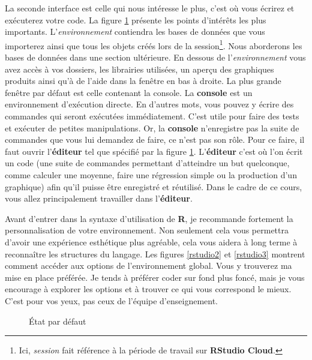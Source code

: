 \documentclass[10.5pt,a4paper]{article}
\begin{document}
La seconde interface est celle qui nous intéresse le plus, c'est où vous écrirez et exécuterez votre code. La figure \ref{rstudio1} présente les points d'intérêts les plus importants. L'\emph{environnement} contiendra les bases de données que vous importerez ainsi que tous les objets créés lors de la session\footnote{Ici, \emph{session} fait référence à la période de travail sur \textbf{RStudio Cloud}.}. Nous aborderons les bases de données dans une section ultérieure. En dessous de l'\emph{environnement} vous avez accès à vos dossiers, les librairies utilisées, un aperçu des graphiques produits ainsi qu'à de l'aide dans la fenêtre en bas à droite. La plus grande fenêtre par défaut est celle contenant la console. La \textbf{console} est un environnement d'exécution directe. En d'autres mots, vous pouvez y écrire des commandes qui seront exécutées immédiatement. C'est utile pour faire des tests et exécuter de petites manipulations. Or, la \textbf{console} n'enregistre pas la suite de commandes que vous lui demandez de faire, ce n'est pas son rôle. Pour ce faire, il faut ouvrir l'\textbf{éditeur} tel que spécifié par la figure \ref{rstudio1}. L'\textbf{éditeur} c'est où l'on écrit un code (une suite de commandes permettant d'atteindre un but quelconque, comme calculer une moyenne, faire une régression simple ou la production d'un graphique) afin qu'il puisse être enregistré et réutilisé. Dans le cadre de ce cours, vous allez principalement travailler dans l'\textbf{éditeur}.

Avant d'entrer dans la syntaxe d'utilisation de \textbf{R}, je recommande fortement la personnalisation de votre environnement. Non seulement cela vous permettra d'avoir une expérience esthétique plus agréable, cela vous aidera à long terme à reconnaître les structures du langage. Les figures \ref{rstudio2} et \ref{rstudio3} montrent comment accéder aux options de l'environnement global. Vous y trouverez ma mise en place préférée. Je tends à préférer coder sur fond plus foncé, mais je vous encourage à explorer les options et à trouver ce qui vous correspond le mieux. C'est pour vos yeux, pas ceux de l'équipe d'enseignement. 

\begin{figure}[H]
  \centering
  \caption{État par défaut}
  \label{rstudio1}
\end{figure}
\end{document}
